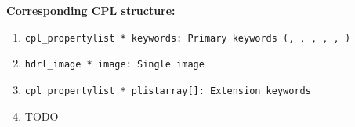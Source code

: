 \begin{datastructdef}
\textbf{Corresponding \ac{CPL} structure:}
\begin{enumerate}

    \item \texttt{cpl\_propertylist * keywords: Primary keywords (\hyperref[fits:dpr.catg]{},  \hyperref[fits:dpr.tech]{},  \hyperref[fits:dpr.type]{},  \hyperref[fits:ins.opti3.name]{},  \hyperref[fits:ins.opti9.name]{},  \hyperref[fits:ins.opti10.name]{})}
    \item \texttt{hdrl\_image * image: Single image}
    \item \texttt{cpl\_propertylist * plistarray[]: Extension keywords}

    \item TODO
\end{enumerate}
\end{datastructdef}


